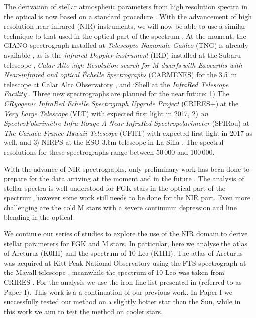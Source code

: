 \documentclass{aa}
\begin{document}
The derivation of stellar atmospheric parameters from high resolution spectra in
the optical is now based on a standard procedure
\citep[see e.g.][]{Valenti2005,Sousa2008a}. With the advancement of high
resolution near-infrared (NIR) instruments, we will now be able to use a similar
technique to that used in the optical part of the spectrum
\citep[see e.g.][]{Melendez1999,Sousa2008a,Tsantaki2013,Mucciarelli2013,Bensby2014}.
At the moment, the GIANO spectrograph installed at \emph{Telescopio Nazionale
Galileo} (TNG) is already available \citep{GIANO}, as is the \emph{infrared Doppler
instrument} (IRD) installed at the Subaru telescope \citep{IRD}, \emph{Calar
Alto high-Resolution search for M dwarfs with Exoearths with Near-infrared and
optical Échelle Spectrographs} (CARMENES) for the \SI{3.5}{m} telescope at Calar
Alto Observatory \citep{CARMENES}, and iShell at the \emph{InfraRed Telescope
Facility} \citep{ishell1,ishell2}. Three new spectrographs are
planned for the near future: 1) The \emph{CRyogenic InfraRed Echelle
Spectrograph Upgrade Project} (CRIRES+) at the \emph{Very Large Telescope} (VLT)
\citep{CRIRESp} with expected first light in 2017, 2) \emph{un
SpectroPolarimètre Infra-Rouge A Near-InfraRed Spectropolarimeter} (SPIRou) at
\emph{The Canada-France-Hawaii Telescope} (CFHT) \citep{SPIROU1,SPIROU2} with
expected first light in 2017 as well, and 3) NIRPS at the ESO 3.6m telescope in
La Silla \citep{NIRPS}. The spectral resolutions for these spectrographs range
between $50\,000$ and $100\,000$.

With the advance of NIR spectrographs, only preliminary work has been done to
prepare for the data arriving at the moment and in the future \citep[see
e.g.][]{Onehag2012,Lindgren2016,Andreasen2016}. The analysis of stellar spectra
is well understood for FGK stars in the optical part of the spectrum, however
some work still needs to be done for the NIR part. Even more challenging are the
cold M stars with a severe continuum depression and line blending in the
optical.

We continue our series of studies to explore the use of the NIR domain to derive
stellar parameters for FGK and M stars. In particular, here we analyse the atlas
of Arcturus (K0III) and the spectrum of 10 Leo (K1III). The atlas of Arcturus
was acquired at Kitt Peak National Observatory using the FTS spectrograph at the
Mayall telescope \citep{Hinkle2003}, meanwhile the spectrum of 10 Leo was taken
from CRIRES \citep{Nicholls2016}. For the analysis we use the iron line list
presented in \citet{Andreasen2016} (referred to as Paper I). This work is a a
continuation of our previous work. In Paper I we successfully tested our method
on a slightly hotter star than the Sun, while in this work we aim to test the
method on cooler stars.
\end{document}
